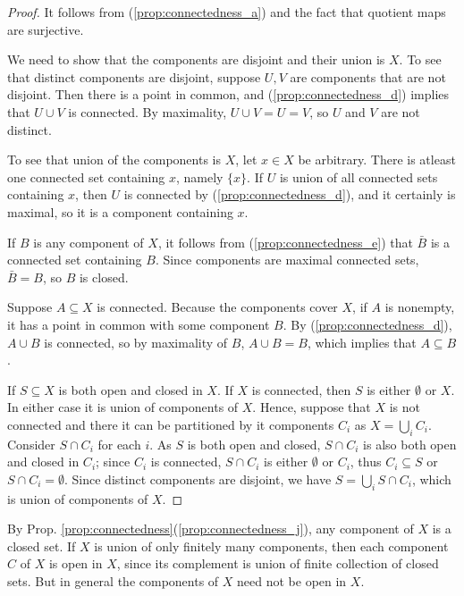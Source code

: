 \documentclass[11pt,a4paper]{article}
\begin{document}
\begin{proof}
\highlight{(\ref{prop:connectedness_h})} It follows from (\ref{prop:connectedness_a}) and the fact that quotient maps are surjective.

\highlight{(\ref{prop:connectedness_i})} We need to show that the components are disjoint and their union is $X$. To see that distinct components are disjoint, suppose $U, V$ are components that are not disjoint. Then there is a point in common, and (\ref{prop:connectedness_d}) implies that $U\cup V$ is connected. By maximality, $U\cup V = U = V$, so $U$ and $V$ are not distinct.

To see that union of the components is $X$, let $x\in X$ be arbitrary. There is atleast one connected set containing $x$, namely $\{x\}$. If $U$ is union of all connected sets containing $x$, then $U$ is connected by (\ref{prop:connectedness_d}), and it certainly is maximal, so it is a component containing $x$.

\highlight{(\ref{prop:connectedness_j})} If $B$ is any component of $X$, it follows from (\ref{prop:connectedness_e}) that $\bar{B}$ is a connected set containing $B$. Since components are maximal connected sets, $\bar{B} = B$, so $B$ is closed.

\highlight{(\ref{prop:connectedness_k})} Suppose $A\subseteq X$ is connected. Because the components cover $X$, if $A$ is nonempty, it has a point in common with some component $B$. By (\ref{prop:connectedness_d}), $A\cup B$ is connected, so by maximality of $B$, $A\cup B = B$, which implies that $A\subseteq B$.

\highlight{(\ref{prop:connectedness_l})} If $S\subseteq X$ is both open and closed in $X$. If $X$ is connected, then $S$ is either $\emptyset$ or $X$. In either case it is union of components of $X$. Hence, suppose that $X$ is not connected and there it can be partitioned by it components $C_i$ as $X = \bigcup_i C_i$. Consider $S\cap C_i$ for each $i$. As $S$ is both open and closed, $S\cap C_i$ is also both open and closed in $C_i$; since $C_i$ is connected, $S\cap C_i$ is either $\emptyset$ or $C_i$, thus $C_i\subseteq S$ or $S\cap C_i=\emptyset$. Since distinct components are disjoint, we have $S = \bigcup_i S\cap C_i$, which is union of components of $X$.
\end{proof}

\begin{remark}
By Prop. \ref{prop:connectedness}(\ref{prop:connectedness_j}), any component of $X$ is a closed set. If $X$ is union of only finitely many components, then each component $C$ of $X$ is open in $X$, since its complement is union of finite collection of closed sets. But in general the components of $X$ need not be open in $X$.
\end{remark}
\end{document}
